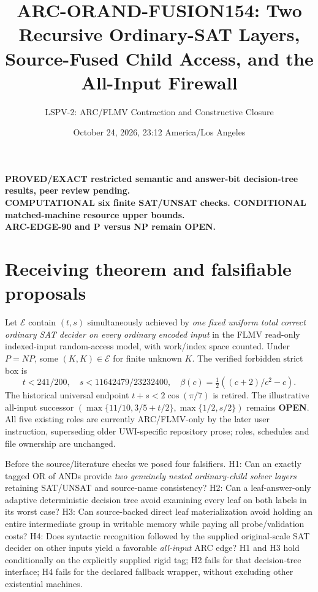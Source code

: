\documentclass[11pt]{article}
\title{ARC-ORAND-FUSION154: Two Recursive Ordinary-SAT Layers, Source-Fused Child Access, and the All-Input Firewall}
\author{LSPV-2: ARC/FLMV Contraction and Constructive Closure}
\date{October 24, 2026, 23:12 America/Los Angeles}
\begin{document}
\maketitle
\begin{center}\textbf{PROVED/EXACT restricted semantic and answer-bit decision-tree results, peer review pending.}\\
\textbf{COMPUTATIONAL six finite SAT/UNSAT checks. CONDITIONAL matched-machine resource upper bounds.}\\
\textbf{ARC-EDGE-90 and P versus NP remain OPEN.}\end{center}
\section{Receiving theorem and falsifiable proposals}
Let $\mathcal E$ contain $(t,s)$ simultaneously achieved by \emph{one fixed uniform total correct ordinary SAT decider on every ordinary encoded input} in the FLMV read-only indexed-input random-access model, with work/index space counted. Under $P=NP$, some $(K,K)\in\mathcal E$ for finite unknown $K$. The verified forbidden strict box is
\[
t<241/200,\quad s<11642479/23232400,\quad
\beta(c)=\tfrac12((c+2)/c^2-c).
\]
The historical universal endpoint $t+s<2\cos(\pi/7)$ is retired. The illustrative all-input successor $(\max\{11/10,3/5+t/2\},\max\{1/2,s/2\})$ remains \textbf{OPEN}. All five existing roles are currently ARC/FLMV-only by the later user instruction, superseding older UWI-specific repository prose; roles, schedules and file ownership are unchanged.

Before the source/literature checks we posed four falsifiers. H1: Can an exactly tagged OR of ANDs provide \emph{two genuinely nested ordinary-child solver layers} retaining SAT/UNSAT and source-name consistency? H2: Can a leaf-answer-only adaptive deterministic decision tree avoid examining every leaf on both labels in its worst case? H3: Can source-backed direct leaf materialization avoid holding an entire intermediate group in writable memory while paying all probe/validation costs? H4: Does syntactic recognition followed by the supplied original-scale SAT decider on other inputs yield a favorable \emph{all-input} ARC edge? H1 and H3 hold conditionally on the explicitly supplied rigid tag; H2 fails for that decision-tree interface; H4 fails for the declared fallback wrapper, without excluding other existential machines.
\end{document}
